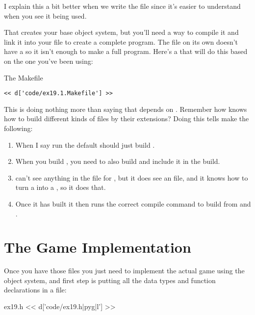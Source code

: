 I explain this a bit better when we write the  file since it's
easier to understand when you see it being used.

That creates your base object system, but you'll need a way to compile it
and link it into your  file to create a complete program.  The
 file on its own doesn't have a  so it isn't
enough to make a full program.  Here's a  that will do this
based on the one you've been using:

\begin{code}{The Makefile}
\begin{lstlisting}
<< d['code/ex19.1.Makefile'] >>
\end{lstlisting}
\end{code}

This  is doing nothing more than saying that 
depends on .  Remember how  knows how to build
different kinds of files by their extensions?  Doing this tells make the
following:

\begin{enumerate}
\item When I say run  the default  should just build
    .
\item When you build , you need to also build 
    and include it in the build.
\item {} can't see anything in the file for , but it does
    see an  file, and it knows how to turn a  into
    a , so it does that.
\item Once it has  built it then runs the correct compile
    command to build  from  and .
\end{enumerate}


\section{The Game Implementation}

Once you have those files you just need to implement the actual game
using the object system, and first step is putting all the data types
and function declarations in a  file:

\begin{code}{ex19.h}
<< d['code/ex19.h|pyg|l'] >>
\end{code}

